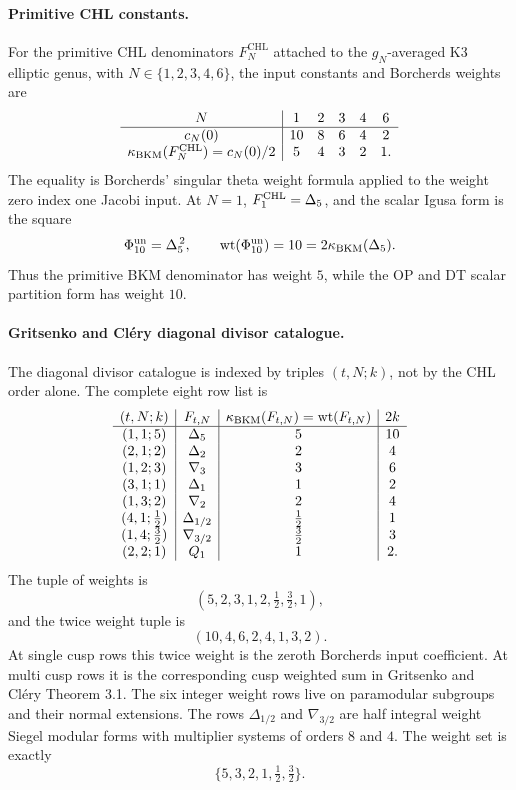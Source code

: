 \paragraph{Primitive CHL constants.}
For the primitive CHL denominators $F_N^{\mathrm{CHL}}$ attached to the
$g_N$-averaged K3 elliptic genus, with
$N\in\{1,2,3,4,6\}$, the input constants and Borcherds weights are
\[
\begin{array}{c|ccccc}
N & 1 & 2 & 3 & 4 & 6\\
\hline
c_N(0) & 10 & 8 & 6 & 4 & 2\\
\kappa_{\mathrm{BKM}}(F_N^{\mathrm{CHL}})=c_N(0)/2 & 5 & 4 & 3 & 2 & 1 .
\end{array}
\]
The equality is Borcherds' singular theta weight formula applied to the
weight zero index one Jacobi input. At $N=1$,
$F_1^{\mathrm{CHL}}=\Delta_{5}$, and the scalar Igusa form is the square
\[
  \Phi_{10}^{\mathrm{un}}=\Delta_{5}^{\,2},\qquad
  \operatorname{wt}(\Phi_{10}^{\mathrm{un}})=10=2\kappa_{\mathrm{BKM}}(\Delta_{5}).
\]
Thus the primitive BKM denominator has weight $5$, while the OP and DT
scalar partition form has weight $10$.

\paragraph{Gritsenko and Cl\'ery diagonal divisor catalogue.}
The diagonal divisor catalogue is indexed by triples $(t,N;k)$, not by
the CHL order alone. The complete eight row list is
\[
\begin{array}{c|c|c|c}
(t,N;k) & F_{t,N} & \kappa_{\mathrm{BKM}}(F_{t,N})=\operatorname{wt}(F_{t,N}) & 2k\\
\hline
(1,1;5) & \Delta_{5} & 5 & 10\\
(2,1;2) & \Delta_2 & 2 & 4\\
(1,2;3) & \nabla_3 & 3 & 6\\
(3,1;1) & \Delta_1 & 1 & 2\\
(1,3;2) & \nabla_2 & 2 & 4\\
(4,1;\tfrac12) & \Delta_{1/2} & \tfrac12 & 1\\
(1,4;\tfrac32) & \nabla_{3/2} & \tfrac32 & 3\\
(2,2;1) & Q_1 & 1 & 2 .
\end{array}
\]
The tuple of weights is
\[
  (5,2,3,1,2,\tfrac12,\tfrac32,1),
\]
and the twice weight tuple is
\[
  (10,4,6,2,4,1,3,2).
\]
At single cusp rows this twice weight is the zeroth Borcherds input
coefficient. At multi cusp rows it is the corresponding cusp weighted
sum in Gritsenko and Cl\'ery Theorem 3.1. The six integer weight rows
live on paramodular subgroups and their normal extensions. The rows
$\Delta_{1/2}$ and $\nabla_{3/2}$ are half integral weight Siegel
modular forms with multiplier systems of orders $8$ and $4$. The
weight set is exactly
\[
  \{5,3,2,1,\tfrac12,\tfrac32\}.
\]

